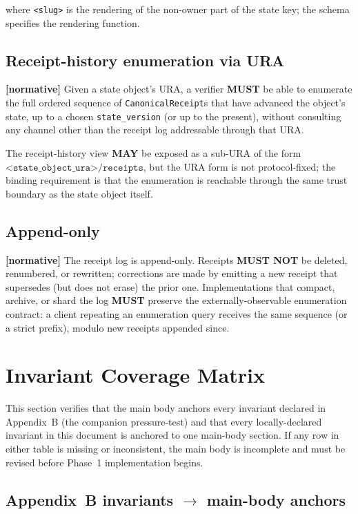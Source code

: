 \documentclass[11pt,a4paper]{article}
\newcommand{\normsv}{\textcolor{normativecolor}{\textbf{[normative]}}\xspace}
\theoremstyle{definition}
\begin{document}
where \texttt{<slug>} is the rendering of the non-owner part of
the state key; the schema specifies the rendering function.

\subsection{Receipt-history enumeration via URA}

\normsv{}
Given a state object's URA, a verifier \textbf{MUST} be able to
enumerate the full ordered sequence of \texttt{CanonicalReceipt}s
that have advanced the object's state, up to a chosen
\texttt{state\_version} (or up to the present), without
consulting any channel other than the receipt log addressable
through that URA.

The receipt-history view \textbf{MAY} be exposed as a sub-URA of
the form $\texttt{<state\_object\_ura>/receipts}$, but the URA
form is not protocol-fixed; the binding requirement is that the
enumeration is reachable through the same trust boundary as the
state object itself.

\subsection{Append-only}

\normsv{}
The receipt log is append-only. Receipts \textbf{MUST NOT} be
deleted, renumbered, or rewritten; corrections are made by emitting
a new receipt that supersedes (but does not erase) the prior one.
Implementations that compact, archive, or shard the log
\textbf{MUST} preserve the externally-observable enumeration
contract: a client repeating an enumeration query receives the
same sequence (or a strict prefix), modulo new receipts appended
since.

\section{Invariant Coverage Matrix}
\label{sec:coverage}

This section verifies that the main body anchors every invariant
declared in Appendix~B (the companion pressure-test) and that
every locally-declared invariant in this document is anchored to
one main-body section. If any row in either table is missing or
inconsistent, the main body is incomplete and must be revised
before Phase~1 implementation begins.

\subsection{Appendix~B invariants $\rightarrow$ main-body anchors}
\end{document}
